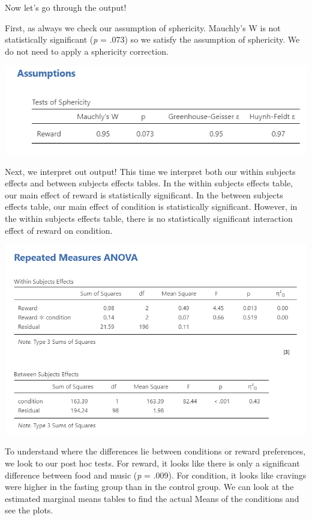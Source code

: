 \documentclass[
]{book}
\begin{document}
Now let's go through the output!

First, as always we check our assumption of sphericity. Mauchly's W is not statistically significant (\emph{p} = .073) so we satisfy the assumption of sphericity. We do not need to apply a sphericity correction.

\includegraphics{images/06-factorial-anova/mixed_assumptions.png}

Next, we interpret out output! This time we interpret both our within subjects effects and between subjects effects tables. In the within subjects effects table, our main effect of reward is statistically significant. In the between subjects effects table, our main effect of condition is statistically significant. However, in the within subjects effects table, there is no statistically significant interaction effect of reward on condition.

\includegraphics{images/06-factorial-anova/mixed_results.png}

To understand where the differences lie between conditions or reward preferences, we look to our post hoc tests. For reward, it looks like there is only a significant difference between food and music (\emph{p} = .009). For condition, it looks like cravings were higher in the fasting group than in the control group. We can look at the estimated marginal means tables to find the actual Means of the conditions and see the plots.
\end{document}

